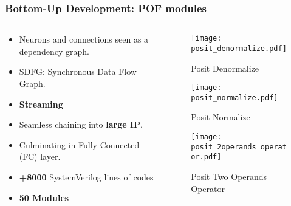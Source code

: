 \begin{frame}
    \frametitle{Bottom-Up Development: POF modules}

    \begin{columns}
        \begin{column}{0.5\textwidth}
            \begin{itemize}
                \item<1-> Neurons and connections seen as a dependency graph.
                \item<1-> SDFG: Synchronous Data Flow Graph.
		\item<1-> \textbf{Streaming}
		\item<2-> Seamless chaining into \textbf{large IP}.
                \item<2-> Culminating in Fully Connected (FC) layer.
		\item<3-> \textbf{+8000} SystemVerilog lines of codes
		\item<3-> \textbf{50 Modules}
            \end{itemize}
        \end{column}

        \begin{column}{0.5\textwidth}
            \begin{figure}
                \centering
                \texttt{[image: posit\_denormalize.pdf]}
                \vspace{-0.3cm}
                \caption{Posit Denormalize}
                \texttt{[image: posit\_normalize.pdf]}
                \vspace{-0.3cm}
                \caption{Posit Normalize}
                \texttt{[image: posit\_2operands\_operator.pdf]}
                \vspace{-0.3cm}
                \caption{Posit Two Operands Operator}
                \vspace{-0.3cm}
            \end{figure}
        \end{column}
    \end{columns}

\end{frame}


